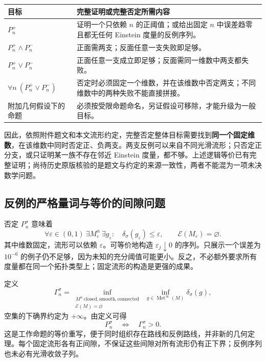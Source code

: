 \documentclass[11pt,a4paper]{article}
\theoremstyle{definition}
\newcommand{\Met}{\operatorname{Met}}
\newcommand{\Ein}{\mathcal E}
\begin{document}
\begin{longtable}{P{0.31\textwidth}P{0.62\textwidth}}
\toprule
目标 & 完整证明或完整否定所需内容\\\midrule
$P_n^+$ & 证明一个只依赖 $n$ 的正阈值；或给出固定 $n$ 中误差趋零且都无任何 Einstein 度量的反例序列。\\
$P_n^+\wedge P_n^-$ & 正面需两支；反面任意一支失败即足够。\\
$P_n^+\vee P_n^-$ & 正面任意一支成立即足够；反面需同一维数中两支都失败。\\
$\forall n\ (P_n^+\vee P_n^-)$ & 否定时必须固定一个维数，并在该维数中否定两支；不同维数中的两种失败不能直接拼接。\\
附加几何假设下的命题 & 必须按受限命题命名，另证假设可移除，才能升级为一般目标。\\\bottomrule
\end{longtable}

因此，依照附件题文和本文流形约定，完整否定整体目标需要找到\textbf{同一个固定维数}，在该维数中同时否定正、负两支。两支反例可以来自不同光滑流形；只否定正分支，或只证明某一族不存在邻近 Einstein 度量，都不够。上述逻辑等价已有完整证明；尚待历史原版核验的是题文与约定的来源一致性，两者不能混为一项未决数学问题。

\subsection{反例的严格量词与等价的间隙问题}

否定 $P_n^\sigma$ 意味着
\begin{equation}\label{eq:neg}
\forall\varepsilon\in(0,1)\ \exists M_\varepsilon^n\ \exists g_\varepsilon:\quad
\delta_\sigma(g_\varepsilon)\le\varepsilon,\qquad
\Ein(M_\varepsilon)=\varnothing.
\end{equation}
其中维数固定，流形可以依赖 $\varepsilon$。可等价地构造 $\varepsilon_j\downarrow0$ 的序列。只展示一个误差为 $10^{-6}$ 的例子仍不足够，因为未知的充分阈值可能更小。反之，不必额外要求所有度量都在同一个拓扑类型上；固定流形的构造是更强的成果。

定义
\[
\Gamma_n^\sigma=
\inf_{\substack{M^n\ \mathrm{closed,smooth,connected}\\\Ein(M)=\varnothing}}
\ \inf_{g\in\Met^\infty(M)}\delta_\sigma(g),
\]
空集的下确界约定为 $+\infty$。由定义可得
\[
P_n^\sigma\quad\Longleftrightarrow\quad\Gamma_n^\sigma>0.
\]
这是工作命题的等价重写，便于同时组织存在路线和反例路线，并非新的几何定理。每个固定流形各有正间隙，不保证这些间隙对所有流形仍有正下界；反例序列也未必有光滑收敛子列。
\end{document}
